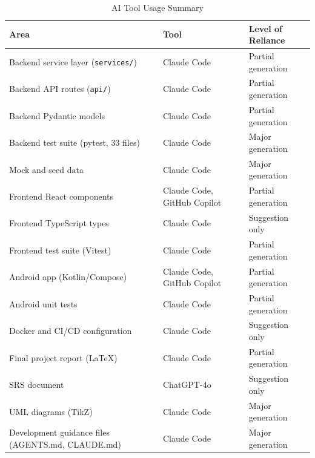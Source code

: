 \documentclass[11pt,a4paper]{report}
\begin{document}
\begin{table}[h]
    \centering
    \begin{tabularx}{\textwidth}{|X|l|l|}
        \hline
        \textbf{Area}                                     & \textbf{Tool}               & \textbf{Level of Reliance} \\
        \hline
        Backend service layer (\texttt{services/})        & Claude Code                 & Partial generation         \\
        \hline
        Backend API routes (\texttt{api/})                & Claude Code                 & Partial generation         \\
        \hline
        Backend Pydantic models                           & Claude Code                 & Partial generation         \\
        \hline
        Backend test suite (pytest, 33 files)             & Claude Code                 & Major generation           \\
        \hline
        Mock and seed data                                & Claude Code                 & Major generation           \\
        \hline
        Frontend React components                         & Claude Code, GitHub Copilot & Partial generation         \\
        \hline
        Frontend TypeScript types                         & Claude Code                 & Suggestion only            \\
        \hline
        Frontend test suite (Vitest)                      & Claude Code                 & Partial generation         \\
        \hline
        Android app (Kotlin/Compose)                      & Claude Code, GitHub Copilot & Partial generation         \\
        \hline
        Android unit tests                                & Claude Code                 & Partial generation         \\
        \hline
        Docker and CI/CD configuration                    & Claude Code                 & Suggestion only            \\
        \hline
        Final project report (LaTeX)                      & Claude Code                 & Partial generation         \\
        \hline
        SRS document                                      & ChatGPT-4o                  & Suggestion only            \\
        \hline
        UML diagrams (TikZ)                               & Claude Code                 & Major generation           \\
        \hline
        Development guidance files (AGENTS.md, CLAUDE.md) & Claude Code                 & Major generation           \\
        \hline
    \end{tabularx}
    \caption{AI Tool Usage Summary}
\end{table}
\end{document}
